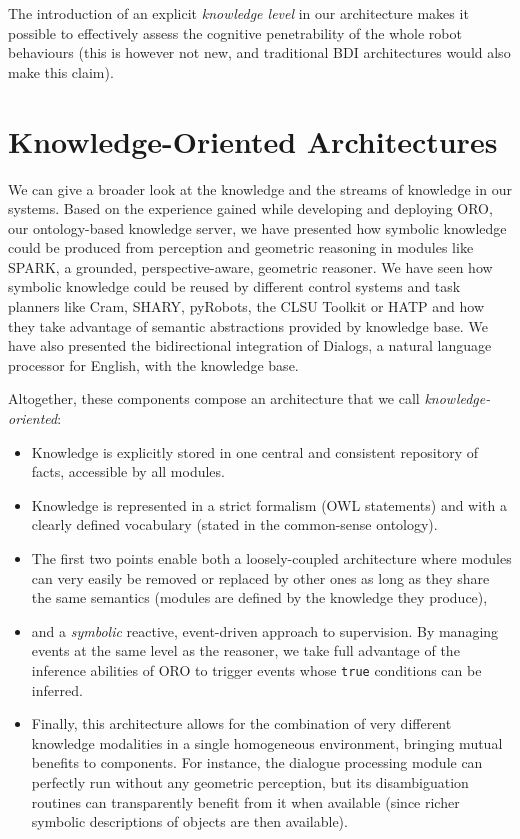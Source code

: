 The introduction of an explicit \emph{knowledge level} in our architecture
makes it possible to effectively assess the cognitive penetrability of the
whole robot behaviours (this is however not new, and traditional BDI
architectures would also make this claim).

\section{Knowledge-Oriented Architectures}

We can give a broader look at the knowledge and the streams of knowledge in our
systems.  Based on the experience gained while developing and deploying {\sc
ORO}, our ontology-based knowledge server, we have presented how symbolic
knowledge could be produced from perception and geometric reasoning in modules
like {\sc SPARK}, a grounded, perspective-aware, geometric reasoner. We have
seen how symbolic knowledge could be reused by different control systems and
task planners like {\sc Cram}, {\sc SHARY}, {\sc pyRobots}, the {\sc CLSU
Toolkit} or {\sc HATP} and how they take advantage of semantic abstractions
provided by knowledge base. We have also presented the bidirectional
integration of {\sc Dialogs}, a natural language processor for English, with
the knowledge base.

Altogether, these components compose an architecture that we call
\emph{knowledge-oriented}:

\begin{itemize}
    
    \item{Knowledge is explicitly stored in one central and consistent
    repository of facts, accessible by all modules.} 

    \item{Knowledge is represented in a strict formalism (OWL statements) and
    with a clearly defined vocabulary (stated in the common-sense ontology).}

    \item{The first two points enable both a loosely-coupled architecture where
    modules can very easily be removed or replaced by other ones as long as
    they share the same semantics (modules are defined by the knowledge they
    produce),} 

    \item{and a \emph{symbolic} reactive, event-driven approach to supervision.
    By managing events at the same level as the reasoner, we take full
    advantage of the inference abilities of ORO to trigger events whose
    \texttt{true} conditions can be inferred.} 

    \item{Finally, this architecture allows for the combination of very
    different knowledge modalities in a single homogeneous environment,
    bringing mutual benefits to components. For instance, the dialogue
    processing module can perfectly run without any geometric
    perception, but its disambiguation routines can transparently
    benefit from it when available (since richer symbolic descriptions of
    objects are then available).}

\end{itemize}

